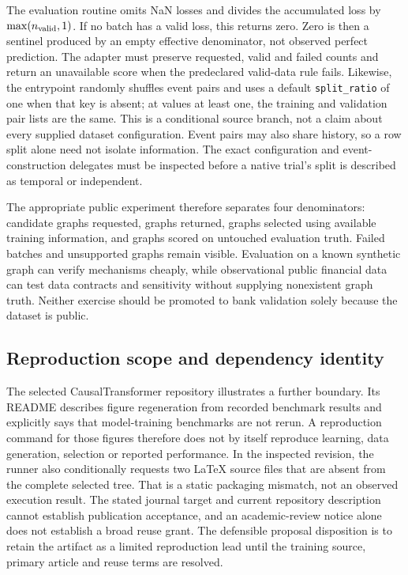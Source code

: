 The evaluation routine omits NaN losses and divides the accumulated loss by
$\max(n_{\rm valid},1)$. If no batch has a valid loss, this returns zero. Zero is then a
sentinel produced by an empty effective denominator, not observed perfect prediction. The adapter
must preserve requested, valid and failed counts and return an unavailable score when the
predeclared valid-data rule fails. Likewise, the entrypoint randomly shuffles event pairs and
uses a default \texttt{split\_ratio} of one when that key is absent; at values at least one,
the training and validation pair lists are the same. This is a conditional source branch,
not a claim about every supplied dataset configuration. Event pairs may also share history,
so a row split alone need not isolate information. The exact configuration and event-construction
delegates must be inspected before a native trial's split is described as temporal or independent.
\citep{exec28_at_tacd}

The appropriate public experiment therefore separates four denominators: candidate graphs
requested, graphs returned, graphs selected using available training information, and graphs
scored on untouched evaluation truth. Failed batches and unsupported graphs remain visible.
Evaluation on a known synthetic graph can verify mechanisms cheaply, while observational public
financial data can test data contracts and sensitivity without supplying nonexistent graph truth.
Neither exercise should be promoted to bank validation solely because the dataset is public.

\subsection{Reproduction scope and dependency identity}
The selected CausalTransformer repository illustrates a further boundary. Its README describes
figure regeneration from recorded benchmark results and explicitly says that model-training
benchmarks are not rerun. A reproduction command for those figures therefore does not by itself
reproduce learning, data generation, selection or reported performance. In the inspected revision,
the runner also conditionally requests two LaTeX source files that are absent from the complete
selected tree. That is a static packaging mismatch, not an observed execution result. The stated
journal target and current repository description cannot establish publication acceptance, and
an academic-review notice alone does not establish a broad reuse grant. The defensible proposal
disposition is to retain the artifact as a limited reproduction lead until the training source,
primary article and reuse terms are resolved.\citep{exec28_at_ct}

